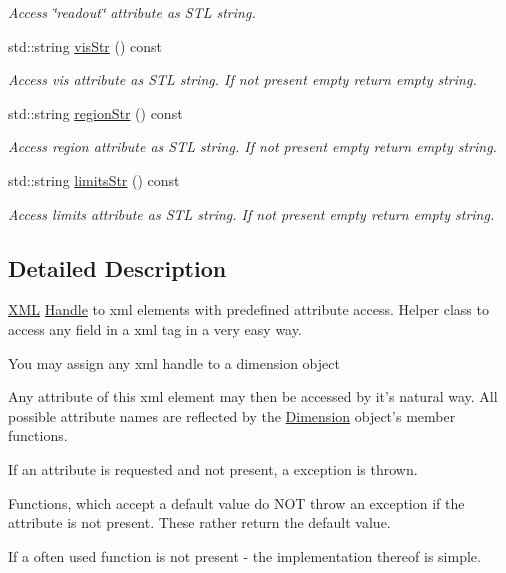 \begin{DoxyCompactItemize}
\begin{DoxyCompactList}\small\item\em Access \char`\"{}readout\char`\"{} attribute as STL string. \item\end{DoxyCompactList}\item 
std::string \hyperlink{struct_d_d4hep_1_1_x_m_l_1_1_dimension_a9cabd4407763b0c9e334acdda19310ea}{visStr} () const 
\begin{DoxyCompactList}\small\item\em Access vis attribute as STL string. If not present empty return empty string. \item\end{DoxyCompactList}\item 
std::string \hyperlink{struct_d_d4hep_1_1_x_m_l_1_1_dimension_a388b5d319097db233341e251a78f7f3c}{regionStr} () const 
\begin{DoxyCompactList}\small\item\em Access region attribute as STL string. If not present empty return empty string. \item\end{DoxyCompactList}\item 
std::string \hyperlink{struct_d_d4hep_1_1_x_m_l_1_1_dimension_a389d11b87b3ad9d752cb6efd514c2b4b}{limitsStr} () const 
\begin{DoxyCompactList}\small\item\em Access limits attribute as STL string. If not present empty return empty string. \item\end{DoxyCompactList}\end{DoxyCompactItemize}


\subsection{Detailed Description}
\hyperlink{namespace_d_d4hep_1_1_x_m_l}{XML} \hyperlink{class_d_d4hep_1_1_handle}{Handle} to xml elements with predefined attribute access. Helper class to access any field in a xml tag in a very easy way.
\begin{DoxyItemize}
\item You may assign any xml handle to a dimension object
\item Any attribute of this xml element may then be accessed by it's natural way. All possible attribute names are reflected by the \hyperlink{struct_d_d4hep_1_1_x_m_l_1_1_dimension}{Dimension} object's member functions.
\item If an attribute is requested and not present, a exception is thrown.
\item Functions, which accept a default value do NOT throw an exception if the attribute is not present. These rather return the default value.
\item If a often used function is not present -\/ the implementation thereof is simple.
\end{DoxyItemize}

